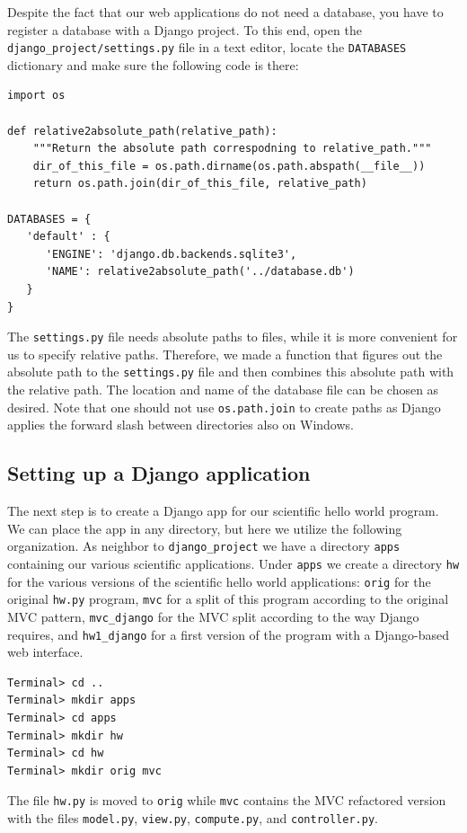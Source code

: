 \documentclass[%
oneside,                 %
final,                   %
10pt]{article}
\begin{document}
Despite the fact that our web applications do not need a database, you
have to register a database with a Django project. To this end,
open the \Verb!django_project/settings.py! file in a text editor,
locate the \Verb!DATABASES! dictionary and make sure the following
code is there:

\begin{Verbatim}[numbers=none,fontsize=\fontsize{9pt}{9pt},baselinestretch=0.85]
import os

def relative2absolute_path(relative_path):
    """Return the absolute path correspodning to relative_path."""
    dir_of_this_file = os.path.dirname(os.path.abspath(__file__))
    return os.path.join(dir_of_this_file, relative_path)

DATABASES = {
   'default' : {
      'ENGINE': 'django.db.backends.sqlite3',
      'NAME': relative2absolute_path('../database.db')
   }
}
\end{Verbatim}
The \Verb!settings.py! file needs absolute paths to files, while it is
more convenient for us to specify relative paths. Therefore,
we made a function that figures out the absolute path to the \Verb!settings.py!
file and then combines this absolute path with the relative path.
The location and name of the database file can be chosen as desired.
Note that one should not use \Verb!os.path.join! to create paths as Django
applies the forward slash between directories also on Windows.


\subsection{Setting up a Django application}


The next step is to create a Django app for our scientific hello
world program. We can place the app in any directory, but here we
utilize the following organization.
As neighbor to \Verb!django_project! we have
a directory \Verb!apps! containing our various scientific applications.
Under \Verb!apps! we create a directory \Verb!hw!
for the various versions of the scientific hello world applications:
\Verb!orig! for the original \Verb!hw.py! program, \Verb!mvc! for a split of this
program according to the original MVC pattern, \Verb!mvc_django! for
the MVC split according to the way Django requires,
and \Verb!hw1_django! for a first version of
the program with a Django-based web interface.

\begin{Verbatim}[numbers=none,fontsize=\fontsize{9pt}{9pt},baselinestretch=0.85]
Terminal> cd ..
Terminal> mkdir apps
Terminal> cd apps
Terminal> mkdir hw
Terminal> cd hw
Terminal> mkdir orig mvc
\end{Verbatim}
The file \Verb!hw.py! is moved to \Verb!orig! while \Verb!mvc! contains
the MVC refactored version with the files \Verb!model.py!, \Verb!view.py!, \Verb!compute.py!,
and \Verb!controller.py!.
\end{document}

